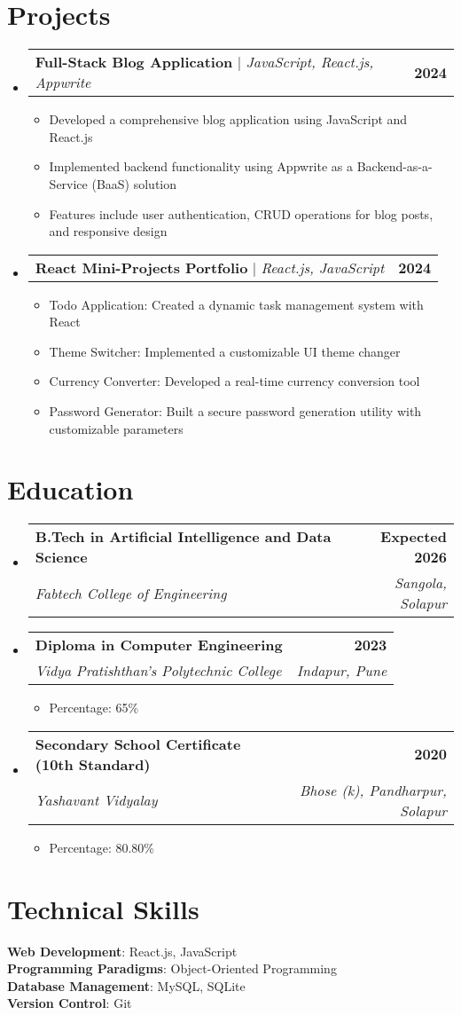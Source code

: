 \documentclass[a4paper,11pt]{article}
\makeatletter
\newcommand{\resumeItem}[1]{
  \item\small{
    {#1 \vspace{-2pt}}
  }
}
\newcommand{\resumeSubheading}[4]{
  \vspace{-2pt}\item
    \begin{tabular*}{1.0\textwidth}[t]{l@{\extracolsep{\fill}}r}
      \textbf{#1} & \textbf{\small #2} \\
      \textit{\small#3} & \textit{\small #4} \\
    \end{tabular*}\vspace{-7pt}
}
\newcommand{\resumeProjectHeading}[2]{
    \item
    \begin{tabular*}{1.001\textwidth}{l@{\extracolsep{\fill}}r}
      \small#1 & \textbf{\small #2}\\
    \end{tabular*}\vspace{-7pt}
}
\newcommand{\resumeSubHeadingListStart}{\begin{itemize}[leftmargin=0.0in, label={}]}
\newcommand{\resumeSubHeadingListEnd}{\end{itemize}}
\newcommand{\resumeItemListStart}{\begin{itemize}}
\newcommand{\resumeItemListEnd}{\end{itemize}\vspace{-5pt}}
\makeatother
\begin{document}
\section{Projects}
\resumeSubHeadingListStart
    \resumeProjectHeading
    {\textbf{Full-Stack Blog Application} $|$ \emph{JavaScript, React.js, Appwrite}}{2024}
    \resumeItemListStart
        \resumeItem{Developed a comprehensive blog application using JavaScript and React.js}
        \resumeItem{Implemented backend functionality using Appwrite as a Backend-as-a-Service (BaaS) solution}
        \resumeItem{Features include user authentication, CRUD operations for blog posts, and responsive design}
    \resumeItemListEnd
    \resumeProjectHeading
    {\textbf{React Mini-Projects Portfolio} $|$ \emph{React.js, JavaScript}}{2024}
    \resumeItemListStart
        \resumeItem{Todo Application: Created a dynamic task management system with React}
        \resumeItem{Theme Switcher: Implemented a customizable UI theme changer}
        \resumeItem{Currency Converter: Developed a real-time currency conversion tool}
        \resumeItem{Password Generator: Built a secure password generation utility with customizable parameters}
    \resumeItemListEnd
\resumeSubHeadingListEnd

\section{Education}
\resumeSubHeadingListStart
    \resumeSubheading
    {B.Tech in Artificial Intelligence and Data Science}{Expected 2026}
    {Fabtech College of Engineering}{Sangola, Solapur}
    \resumeSubheading
    {Diploma in Computer Engineering}{2023}
    {Vidya Pratishthan's Polytechnic College}{Indapur, Pune}
    \resumeItemListStart
        \resumeItem{Percentage: 65\%}
    \resumeItemListEnd
    \resumeSubheading
    {Secondary School Certificate (10th Standard)}{2020}
    {Yashavant Vidyalay}{Bhose (k), Pandharpur, Solapur}
    \resumeItemListStart
        \resumeItem{Percentage: 80.80\%}
    \resumeItemListEnd
\resumeSubHeadingListEnd

\section{Technical Skills}
\begin{itemize}[leftmargin=0.15in, label={}]
    \small{\item{
    \textbf{Web Development}{: React.js, JavaScript} \\
    \textbf{Programming Paradigms}{: Object-Oriented Programming} \\
    \textbf{Database Management}{: MySQL, SQLite} \\
    \textbf{Version Control}{: Git}
    }}
\end{itemize}
\end{document}

